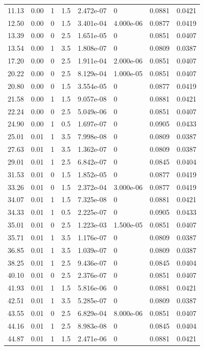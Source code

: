 \documentclass[preview]{standalone}
\begin{document}
{{\begin{tabular}{L{1.2cm}C{1.2cm} C{0.3cm}C{0.5cm} C{1.4cm}C{1.4cm} C{1.4cm}C{1.4cm}}
  11.13  &  0.00  & 1     & 1.5 &  2.472e-07  & 0  & 0.0881 &  0.0421   \\ 
  12.50  &  0.00  & 0     & 1.5 &  3.401e-04  & 4.000e-06  & 0.0877 &  0.0419   \\ 
  13.39  &  0.00  & 0     & 2.5 &  1.651e-05  & 0  & 0.0851 &  0.0407   \\ 
  13.54  &  0.00  & 1     & 3.5 &  1.808e-07  & 0  & 0.0809 &  0.0387   \\ 
  17.20  &  0.00  & 0     & 2.5 &  1.911e-04  & 2.000e-06  & 0.0851 &  0.0407   \\ 
  20.22  &  0.00  & 0     & 2.5 &  8.129e-04  & 1.000e-05  & 0.0851 &  0.0407   \\ 
  20.80  &  0.00  & 0     & 1.5 &  3.554e-05  & 0  & 0.0877 &  0.0419   \\ 
  21.58  &  0.00  & 1     & 1.5 &  9.057e-08  & 0  & 0.0881 &  0.0421   \\ 
  22.24  &  0.00  & 0     & 2.5 &  5.049e-06  & 0  & 0.0851 &  0.0407   \\ 
  24.90  &  0.00  & 1     & 0.5 &  1.697e-07  & 0  & 0.0905 &  0.0433   \\ 
  25.01  &  0.01  & 1     & 3.5 &  7.998e-08  & 0  & 0.0809 &  0.0387   \\ 
  27.63  &  0.01  & 1     & 3.5 &  1.362e-07  & 0  & 0.0809 &  0.0387   \\ 
  29.01  &  0.01  & 1     & 2.5 &  6.842e-07  & 0  & 0.0845 &  0.0404   \\ 
  31.53  &  0.01  & 0     & 1.5 &  1.852e-05  & 0  & 0.0877 &  0.0419   \\ 
  33.26  &  0.01  & 0     & 1.5 &  2.372e-04  & 3.000e-06  & 0.0877 &  0.0419   \\ 
  34.07  &  0.01  & 1     & 1.5 &  7.325e-08  & 0  & 0.0881 &  0.0421   \\ 
  34.33  &  0.01  & 1     & 0.5 &  2.225e-07  & 0  & 0.0905 &  0.0433   \\ 
  35.01  &  0.01  & 0     & 2.5 &  1.223e-03  & 1.500e-05  & 0.0851 &  0.0407   \\ 
  35.71  &  0.01  & 1     & 3.5 &  1.176e-07  & 0  & 0.0809 &  0.0387   \\ 
  36.85  &  0.01  & 1     & 3.5 &  1.039e-07  & 0  & 0.0809 &  0.0387   \\ 
  38.25  &  0.01  & 1     & 2.5 &  9.436e-07  & 0  & 0.0845 &  0.0404   \\ 
  40.10  &  0.01  & 0     & 2.5 &  2.376e-07  & 0  & 0.0851 &  0.0407   \\ 
  41.93  &  0.01  & 1     & 1.5 &  5.816e-06  & 0  & 0.0881 &  0.0421   \\ 
  42.51  &  0.01  & 1     & 3.5 &  5.285e-07  & 0  & 0.0809 &  0.0387   \\ 
  43.55  &  0.01  & 0     & 2.5 &  6.829e-04  & 8.000e-06  & 0.0851 &  0.0407   \\ 
  44.16  &  0.01  & 1     & 2.5 &  8.983e-08  & 0  & 0.0845 &  0.0404   \\ 
  44.87  &  0.01  & 1     & 1.5 &  2.471e-06  & 0  & 0.0881 &  0.0421   \\ 
\hline 
\end{tabular} 

}}
\end{document}
